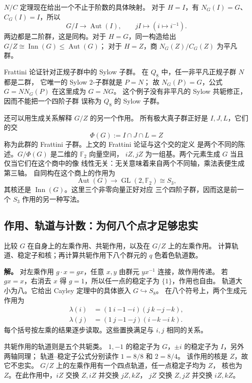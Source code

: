 $N/C$ 定理现在给出一个不止于阶数的具体映射。
对于 $H=I$，有 $N_G(I)=G$、$C_G(I)=I$，所以
\[
G/I\longrightarrow\operatorname{Aut}(I),
\qquad jI\longmapsto(i\mapsto i^{-1}).
\]
两边都是二阶群，这是同构。对于 $H=G$，同一构造给出
$G/Z\cong\operatorname{Inn}(G)\leq\operatorname{Aut}(G)$；
对于 $H=Z$，商 $N_G(Z)/C_G(Z)$ 为平凡群。

Frattini 论证针对正规子群中的 Sylow 子群。
在 $Q_8$ 中，任一非平凡正规子群 $N$ 都是二群，
它唯一的 Sylow $2$-子群就是 $P=N$；
故 $N_G(P)=G$，公式 $G=N N_G(P)$ 在这里成为 $G=NG$。
这个例子没有非平凡的 Sylow 共轭修正，因而不能把一个四阶子群
误称为 $Q_8$ 的 Sylow 子群。

还可以用生成关系解释 $G/Z$ 的另一个作用。
所有极大真子群正好是 $I,J,L$，它们的交
\[
\Phi(G):=I\cap J\cap L=Z
\]
称为此群的 Frattini 子群。上文的 Frattini 论证与这个交的定义
是两个不同的陈述。$G/\Phi(G)$ 是二维的 $\mathbb F_2$ 向量空间，
$iZ,jZ$ 为一组基。两个元素生成 $G$ 当且仅当它们在这个商中的像
线性无关：无关意味着来自两个不同轴，乘法表便生成第三轴。
自同构在这个商上的作用为
\[
\operatorname{Aut}(G)\longrightarrow
\operatorname{GL}(2,\mathbb F_2)\cong S_3,
\]
其核还是 $\operatorname{Inn}(G)$。这里三个非零向量正好对应
三个四阶子群，因而这是前一个 $S_3$ 作用的另一种写法。

\subsection{作用、轨道与计数：为何八个点才足够忠实}

\begin{exbox}[同一个群的三种有限集合动作]
比较 $G$ 在自身上的左乘作用、共轭作用，以及在 $G/Z$ 上的左乘作用。
计算轨道、稳定子和核；再计算共轭作用下八个群元的 $q$ 色着色轨道数。
\end{exbox}

\textbf{解。} 对左乘作用 $g\cdot x=gx$，任意 $x,y$ 由群元 $yx^{-1}$ 连接，故作用传递。
若 $gx=x$，右消去 $x$ 得 $g=1$，所以任一点的稳定子为 $\{1\}$，作用也自由。
轨道大小为八。它给出 Cayley 定理中的具体嵌入 $G\hookrightarrow S_8$。
在八个符号上，两个生成元作用为
\[
\begin{aligned}
\lambda(i)&=(1\ i\ {-1}\ {-i})(j\ k\ {-j}\ {-k}),\\
\lambda(j)&=(1\ j\ {-1}\ {-j})(i\ {-k}\ {-i}\ k).
\end{aligned}
\]
每个括号按左乘的结果逐步读取。这些置换满足与 $i,j$ 相同的关系。

共轭作用的轨道则是五个共轭类。
$1,-1$ 的稳定子为 $G$，$\pm i$ 的稳定子为 $I$，另外两轴同理；
轨道--稳定子公式分别读作 $1=8/8$ 和 $2=8/4$。
该作用的核是 $Z$，故它不忠实。
$G/Z$ 上的左乘作用有一个四点轨道，任一点稳定子均为 $Z$，
核也为 $Z$。在此作用中，$iZ$ 交换 $Z,iZ$ 并交换 $jZ,kZ$，
$jZ$ 交换 $Z,jZ$ 并交换 $iZ,kZ$。

